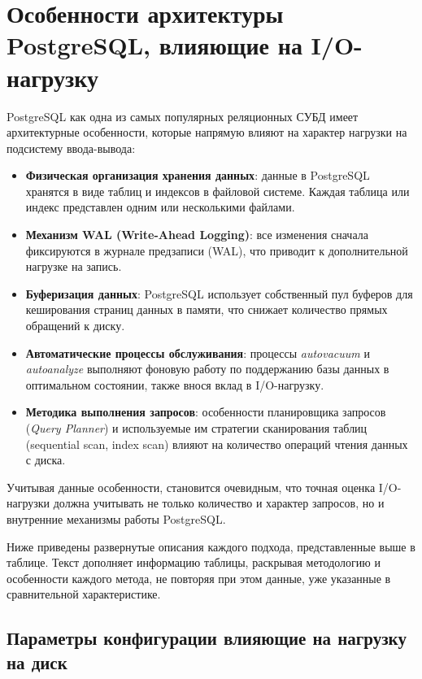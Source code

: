 \section{Особенности архитектуры PostgreSQL, влияющие на I/O-нагрузку}

PostgreSQL как одна из самых популярных реляционных СУБД имеет архитектурные особенности, которые напрямую влияют на характер нагрузки на подсистему ввода-вывода:

\begin{itemize}
    \item \textbf{Физическая организация хранения данных}: данные в PostgreSQL хранятся в виде таблиц и индексов в файловой системе. Каждая таблица или индекс представлен одним или несколькими файлами.
    \item \textbf{Механизм WAL (Write-Ahead Logging)}: все изменения сначала фиксируются в журнале предзаписи (WAL), что приводит к дополнительной нагрузке на запись.
    \item \textbf{Буферизация данных}: PostgreSQL использует собственный пул буферов для кеширования страниц данных в памяти, что снижает количество прямых обращений к диску.
    \item \textbf{Автоматические процессы обслуживания}: процессы \textit{autovacuum} и \textit{autoanalyze} выполняют фоновую работу по поддержанию базы данных в оптимальном состоянии, также внося вклад в I/O-нагрузку.
    \item \textbf{Методика выполнения запросов}: особенности планировщика запросов (\textit{Query Planner}) и используемые им стратегии сканирования таблиц (sequential scan, index scan) влияют на количество операций чтения данных с диска.
\end{itemize}

Учитывая данные особенности, становится очевидным, что точная оценка I/O-нагрузки должна учитывать не только количество и характер запросов, но и внутренние механизмы работы PostgreSQL.

Ниже приведены развернутые описания каждого подхода, представленные выше в таблице. Текст дополняет информацию таблицы, раскрывая методологию и особенности каждого метода, не повторяя при этом данные, уже указанные в сравнительной характеристике.


\subsection{Параметры конфигурации влияющие на нагрузку на диск}

